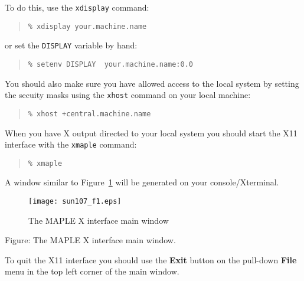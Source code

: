 \documentclass[twoside,11pt]{article}
\newcommand{\htmladdimg}[1]{}
\newenvironment{latexonly}{}{}
\begin{document}
To do this, use the \texttt{xdisplay} command:

\begin{quote}\begin{verbatim}
% xdisplay your.machine.name
\end{verbatim}\end{quote}

or set the \texttt{DISPLAY} variable by hand:

\begin{quote}\begin{verbatim}
% setenv DISPLAY  your.machine.name:0.0
\end{verbatim}\end{quote}

You should also make sure you have allowed access to the local system by 
setting the secuity masks using the \texttt{xhost} command on your local 
machine:

\begin{quote}\begin{verbatim}
% xhost +central.machine.name
\end{verbatim}\end{quote}

When you have X output directed to your local system you should start the
X11 interface with the \texttt{xmaple} command:

\begin{quote}\begin{verbatim}
% xmaple
\end{verbatim}\end{quote}

A window similar to Figure~\ref{fig_main_window} will be generated on your
console/Xterminal.

\begin{latexonly}
\begin{figure}[h]
\begin{center}
\texttt{[image: sun107\_f1.eps]}
\caption{The MAPLE X interface main window}
\label{fig_main_window}
\end{center}
\end{figure}
\end{latexonly}

\begin{htmlonly}
\label{fig_main_window}
\htmladdimg{../sun107_f1.gif}

Figure: The MAPLE X interface main window.
\end{htmlonly}

To quit the X11 interface you should use the \textbf{Exit} button on the
pull-down \textbf{File} menu in the top left corner of the main window.
\end{document}
